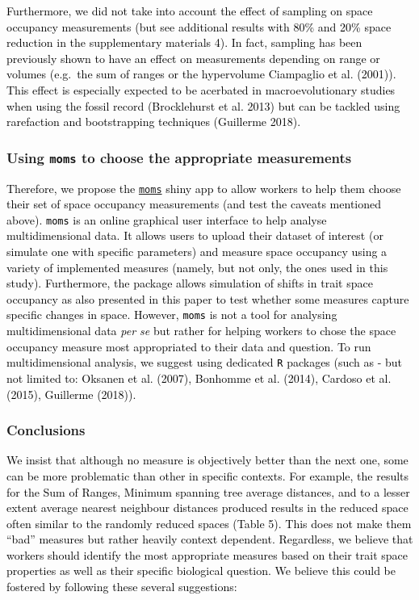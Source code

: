 \documentclass[]{article}
\begin{document}
\textcolor{black}{ Furthermore, we did not take into
account the effect of sampling on space occupancy measurements (but see
additional results with 80\% and 20\% space reduction in the
supplementary materials 4). In fact, sampling has been previously shown
to have an effect on measurements depending on range or volumes
(e.g.~the sum of ranges or the hypervolume Ciampaglio et al. (2001)).
This effect is especially expected to be acerbated in macroevolutionary
studies when using the fossil record (Brocklehurst et al. 2013) but can
be tackled using rarefaction and bootstrapping techniques (Guillerme
2018). }

\subsubsection{\texorpdfstring{Using \texttt{moms} to choose the
appropriate
measurements}{Using moms to choose the appropriate measurements}}\label{using-moms-to-choose-the-appropriate-measurements}

\textcolor{black}{Therefore, we propose the
\href{https://tguillerme.shinyapps.io/moms/}{\texttt{moms}} shiny app to
allow workers to help them choose their set of space occupancy
measurements (and test the caveats mentioned above). \texttt{moms} is an
online graphical user interface to help analyse multidimensional data.
It allows users to upload their dataset of interest (or simulate one
with specific parameters) and measure space occupancy using a variety of
implemented measures (namely, but not only, the ones used in this
study). Furthermore, the package allows simulation of shifts in trait
space occupancy as also presented in this paper to test whether some
measures capture specific changes in space. However, \texttt{moms} is
not a tool for analysing multidimensional data \emph{per se} but rather
for helping workers to chose the space occupancy measure most
appropriated to their data and question. To run multidimensional
analysis, we suggest using dedicated \texttt{R} packages (such as - but
not limited to: Oksanen et al. (2007), Bonhomme et al. (2014), Cardoso
et al. (2015), Guillerme (2018)). }

\subsubsection{Conclusions}\label{conclusions}

\textcolor{black}{We insist that although no measure is
objectively better than the next one, some can be more problematic than
other in specific contexts. For example, the results for the Sum of
Ranges, Minimum spanning tree average distances, and to a lesser extent
average nearest neighbour distances produced results in the reduced
space often similar to the randomly reduced spaces (Table 5). This does
not make them ``bad'' measures but rather heavily context dependent.
Regardless, we believe that workers should identify the most appropriate
measures based on their trait space properties as well as their specific
biological question. We believe this could be fostered by following
these several suggestions: }
\end{document}
